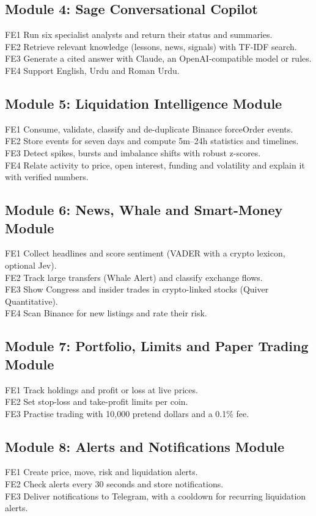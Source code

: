\subsection*{Module 4: Sage Conversational Copilot}
FE1 Run six specialist analysts and return their status and summaries.\\
FE2 Retrieve relevant knowledge (lessons, news, signals) with TF-IDF search.\\
FE3 Generate a cited answer with Claude, an OpenAI-compatible model or rules.\\
FE4 Support English, Urdu and Roman Urdu.

\subsection*{Module 5: Liquidation Intelligence Module}
FE1 Consume, validate, classify and de-duplicate Binance forceOrder events.\\
FE2 Store events for seven days and compute 5m--24h statistics and timelines.\\
FE3 Detect spikes, bursts and imbalance shifts with robust z-scores.\\
FE4 Relate activity to price, open interest, funding and volatility and explain it with verified numbers.

\subsection*{Module 6: News, Whale and Smart-Money Module}
FE1 Collect headlines and score sentiment (VADER with a crypto lexicon, optional Jev).\\
FE2 Track large transfers (Whale Alert) and classify exchange flows.\\
FE3 Show Congress and insider trades in crypto-linked stocks (Quiver Quantitative).\\
FE4 Scan Binance for new listings and rate their risk.

\subsection*{Module 7: Portfolio, Limits and Paper Trading Module}
FE1 Track holdings and profit or loss at live prices.\\
FE2 Set stop-loss and take-profit limits per coin.\\
FE3 Practise trading with 10{,}000 pretend dollars and a 0.1\% fee.

\subsection*{Module 8: Alerts and Notifications Module}
FE1 Create price, move, risk and liquidation alerts.\\
FE2 Check alerts every 30 seconds and store notifications.\\
FE3 Deliver notifications to Telegram, with a cooldown for recurring liquidation alerts.

